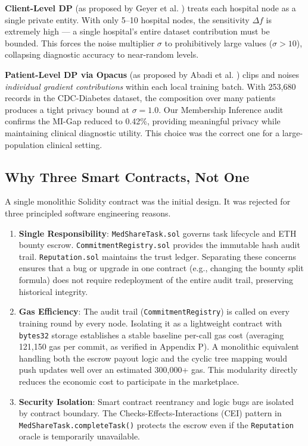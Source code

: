 \documentclass[10pt, a4paper, twocolumn]{article}
\begin{document}
\textbf{Client-Level DP} (as proposed by Geyer et al. \cite{geyer2017}) treats each hospital node as a single private entity. With only 5--10 hospital nodes, the sensitivity $\Delta f$ is extremely high --- a single hospital's entire dataset contribution must be bounded. This forces the noise multiplier $\sigma$ to prohibitively large values ($\sigma > 10$), collapsing diagnostic accuracy to near-random levels.

\textbf{Patient-Level DP via Opacus} (as proposed by Abadi et al. \cite{abadi2016}) clips and noises \textit{individual gradient contributions} within each local training batch. With 253,680 records in the CDC-Diabetes dataset, the composition over many patients produces a tight privacy bound at $\sigma = 1.0$. Our Membership Inference audit confirms the MI-Gap reduced to 0.42\%, providing meaningful privacy while maintaining clinical diagnostic utility. This choice was the correct one for a large-population clinical setting.

\subsection{Why Three Smart Contracts, Not One}
A single monolithic Solidity contract was the initial design. It was rejected for three principled software engineering reasons.

\begin{enumerate}
    \item \textbf{Single Responsibility}: \texttt{MedShareTask.sol} governs task lifecycle and ETH bounty escrow. \texttt{CommitmentRegistry.sol} provides the immutable hash audit trail. \texttt{Reputation.sol} maintains the trust ledger. Separating these concerns ensures that a bug or upgrade in one contract (e.g., changing the bounty split formula) does not require redeployment of the entire audit trail, preserving historical integrity.
    \item \textbf{Gas Efficiency}: The audit trail (\texttt{CommitmentRegistry}) is called on every training round by every node. Isolating it as a lightweight contract with \texttt{bytes32} storage establishes a stable baseline per-call gas cost (averaging 121,150 gas per commit, as verified in Appendix P). A monolithic equivalent handling both the escrow payout logic and the cyclic tree mapping would push updates well over an estimated 300,000+ gas. This modularity directly reduces the economic cost to participate in the marketplace.
    \item \textbf{Security Isolation}: Smart contract reentrancy and logic bugs are isolated by contract boundary. The Checks-Effects-Interactions (CEI) pattern in \texttt{MedShareTask.completeTask()} protects the escrow even if the \texttt{Reputation} oracle is temporarily unavailable.
\end{enumerate}
\end{document}

